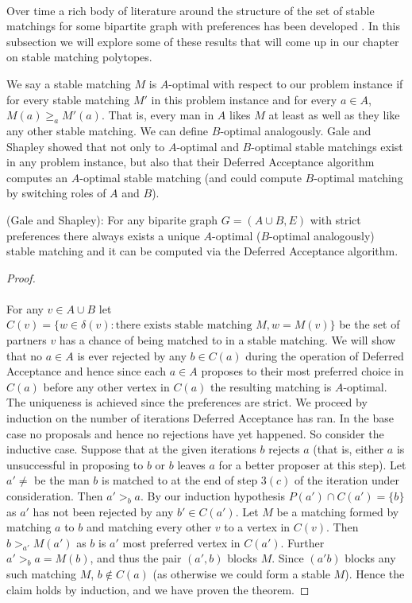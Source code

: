 \paragraph{}
Over time a rich body of literature around the structure of the set of stable matchings for some bipartite graph with preferences has been developed \cite{roth1992two}. In this subsection we will explore some of these results that will come up in our chapter on stable matching polytopes.
\begin{definition} We say a stable matching $M$ is $A$-optimal with respect to our problem instance if for every stable matching $M'$ in this problem instance and for every $a \in A$, $M(a) \geq_a M'(a)$. That is, every man in $A$ likes $M$ at least as well as they like any other stable matching. We can define $B$-optimal analogously. Gale and Shapley showed that not only to $A$-optimal and $B$-optimal stable matchings exist in any problem instance, but also that their Deferred Acceptance algorithm computes an $A$-optimal stable matching \cite{gale1962college} (and could compute $B$-optimal matching by switching roles of $A$ and $B$).
\end{definition}
\begin{theorem} (Gale and Shapley): For any biparite graph $G = (A\cup B, E)$ with strict preferences there always exists a unique $A$-optimal ($B$-optimal analogously) stable matching and it can be computed via the Deferred Acceptance algorithm.
\end{theorem}
\begin{proof}
\paragraph{}
For any $v \in A\cup B$ let $C(v) = \{w \in \delta(v) : \text{there exists stable matching } M, w = M(v) \}$ be the set of partners $v$ has a chance of being matched to in a stable matching. We will show that no $a \in A$ is ever rejected by any $b \in C(a)$ during the operation of Deferred Acceptance and hence since each $a \in A$ proposes to their most preferred choice in $C(a)$ before any other vertex in $C(a)$ the resulting matching is $A$-optimal. The uniqueness is achieved since the preferences are strict. We proceed by induction on the number of iterations Deferred Acceptance has ran. In the base case no proposals and hence no rejections have yet happened. So consider the inductive case. Suppose that at the given iterations $b$ rejects $a$ (that is, either $a$ is unsuccessful in proposing to $b$ or $b$ leaves $a$ for a better proposer at this step). Let $a' \neq$ be the man $b$ is matched to at the end of step $3(c)$ of the iteration under consideration. Then $a' >_b a$. By our induction hypothesis $P(a') \cap C(a') = \{b\}$ as $a'$ has not been rejected by any $b' \in C(a')$. Let $M$ be a matching formed by matching $a$ to $b$ and matching every other $v$ to a vertex in $C(v)$. Then $b >_{a'} M(a')$ as $b$ is $a'$ most preferred vertex in $C(a')$. Further $a' >_b a=M(b)$, and thus the pair $(a',b)$ blocks $M$. Since $(a'b)$ blocks any such matching $M$, $b \not\in C(a)$ (as otherwise we could form a stable $M$). Hence the claim holds by induction, and we have proven the theorem. \end{proof}
